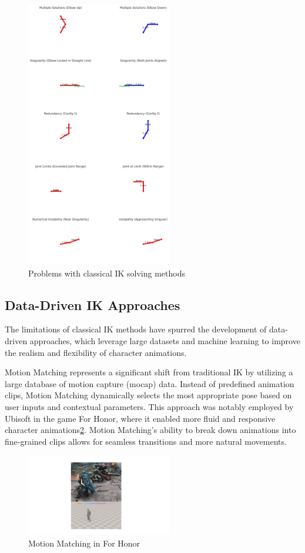 \documentclass[../../main.tex]{subfiles}
\begin{document}
\begin{figure}
  \centering \includegraphics[width = 2.5in]{chapters/motion_matching/images/problems_classical.png}
  \caption{Problems with classical IK solving methods}
  \label{fig:problems_classical}
\end{figure}

\subsection{Data-Driven IK Approaches}
\label{ch:motion_matching:related_work:data_driven_ik}

The limitations of classical IK methods have spurred the development of data-driven approaches, which leverage large datasets and machine learning to improve the realism and flexibility of character animations.

Motion Matching represents a significant shift from traditional IK by utilizing a large database of motion capture (mocap) data. Instead of predefined animation clips, Motion Matching dynamically selects the most appropriate pose based on user inputs and contextual parameters. This approach was notably employed by Ubisoft in the game For Honor, where it enabled more fluid and responsive character animations\ref{fig:for_honor}. Motion Matching's ability to break down animations into fine-grained clips allows for seamless transitions and more natural movements.

\begin{figure}
  \centering \includegraphics[width = 2.5in]{chapters/motion_matching/images/for_honor.png}
  \caption{Motion Matching in For Honor}
  \label{fig:for_honor}
\end{figure}
\end{document}
